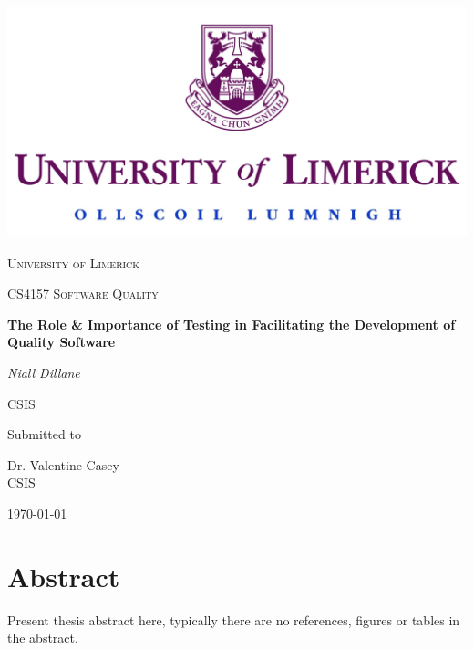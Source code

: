 \documentclass[12pt]{article}
\begin{document}
\thispagestyle{empty}
\setlength\headheight{0pt} 
\begin{center}

\begin{center}
\includegraphics[width=0.65\linewidth]{images/UL_logo.jpg}            
\end{center}	

        \vspace{0.25cm}
        {\scshape\LARGE University of Limerick \par}
        \vspace{0.25cm}
        {\scshape\Large CS4157 Software Quality\par}
        \vspace{0.5cm}

        {\Large\bfseries The Role \& Importance of Testing in Facilitating the Development of Quality Software\par}
        
        \vspace{0.5cm}
        {\Large\itshape Niall Dillane\par}
        CSIS
        \vspace{0.25cm}

\vspace{1cm}
Submitted to\par
Dr. Valentine Casey \\
CSIS\par
\vspace{1.5cm}
\large
\today

\end{center}

\clearpage
\restoregeometry
\justify

\section*{Abstract}
Present thesis abstract here, typically there are no references, figures or tables in the abstract.
\pagebreak


\tableofcontents
\pagebreak
\end{document}
